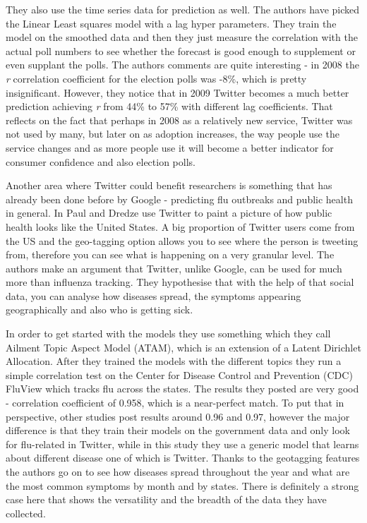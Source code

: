 \documentclass[minf,twoside,singlespacing,parskip,frontabs,notimes,12pt]{infthesis} %
\begin{document}
They also use the time series data for prediction as well. The authors have picked the Linear Least squares model with a lag hyper parameters. They train the model on the smoothed data and then they just measure the correlation with the actual poll numbers to see whether the forecast is good enough to supplement or even supplant the polls. The authors comments are quite interesting - in 2008 the \textit{r} correlation coefficient for the election polls was -8\%, which is pretty insignificant. However, they notice that in 2009 Twitter becomes a much better prediction achieving \textit{r} from 44\% to 57\% with different lag coefficients. That reflects on the fact that perhaps in 2008 as a relatively new service, Twitter was not used by many, but later on as adoption increases, the way people use the service changes and as more people use it will become a better indicator for consumer confidence and also election polls. 

Another area where Twitter could benefit researchers is something that has already been done before by Google - predicting flu outbreaks and public health in general. In Paul and Dredze\cite{twitflu} use Twitter to paint a picture of how public health looks like the United States. A big proportion of Twitter users come from the US and the geo-tagging option allows you to see where the person is tweeting from, therefore you can see what is happening on a very granular level. The authors make an argument that Twitter, unlike Google, can be used for much more than influenza tracking. They hypothesise that with the help of that social data, you can analyse how diseases spread, the symptoms appearing geographically and also who is getting sick. 

In order to get started with the models they use something which they call Ailment Topic Aspect Model (ATAM), which is an extension of a Latent Dirichlet Allocation\cite{lda}. After they trained the models with the different topics they run a simple correlation test on the Center for Disease Control and Prevention (CDC) FluView which tracks flu across the states. The results they posted are very good - correlation coefficient of 0.958, which is a near-perfect match. To put that in perspective, other studies post results around 0.96 and 0.97, however the major difference is that they train their models on the government data and only look for flu-related in Twitter, while in this study they use a generic model that learns about different disease one of which is Twitter. Thanks to the geotagging features the authors go on to see how diseases spread throughout the year and what are the most common symptoms by month and by states. There is definitely a strong case here that shows the versatility and the breadth of the data they have collected. 
\end{document}
